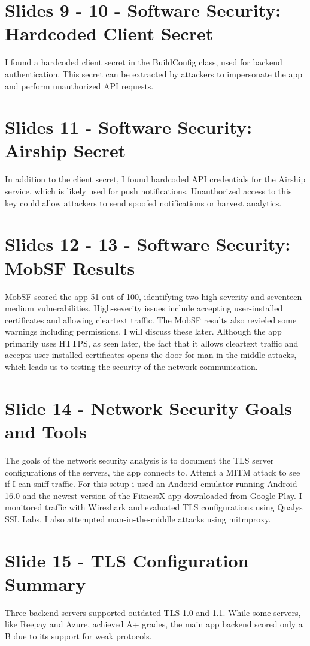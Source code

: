 \documentclass[12pt,a4paper]{article}
\begin{document}
\section*{Slides 9 - 10 - Software Security: Hardcoded Client Secret}
I found a hardcoded client secret in the BuildConfig class, used for backend authentication. This secret can be extracted by attackers to impersonate the app and perform unauthorized API requests.

\section*{Slides 11 - Software Security: Airship Secret}
In addition to the client secret, I found hardcoded API credentials for the Airship service, which is likely used for push notifications. Unauthorized access to this key could allow attackers to send spoofed notifications or harvest analytics.

\section*{Slides 12 - 13 - Software Security: MobSF Results}
MobSF scored the app 51 out of 100, identifying two high-severity and seventeen medium vulnerabilities. High-severity issues include accepting user-installed certificates and allowing cleartext traffic. The MobSF results also revieled some warnings including permissions. I will discuss these later. Although the app primarily uses HTTPS, as seen later, the fact that it allows cleartext traffic and accepts user-installed certificates opens the door for man-in-the-middle attacks, which leads us to testing the security of the network communication.


\section*{Slide 14 - Network Security Goals and Tools}
The goals of the network security analysis is to document the TLS server configurations of the servers, the app connects to. Attemt a MITM attack to see if I can sniff traffic. For this setup i used an Andorid emulator running Android 16.0 and the newest version of the FitnessX app downloaded from Google Play. I monitored traffic with Wireshark and evaluated TLS configurations using Qualys SSL Labs. I also attempted man-in-the-middle attacks using mitmproxy.

\section*{Slide 15 - TLS Configuration Summary}
Three backend servers supported outdated TLS 1.0 and 1.1. While some servers, like Reepay and Azure, achieved A+ grades, the main app backend scored only a B due to its support for weak protocols.
\end{document}
